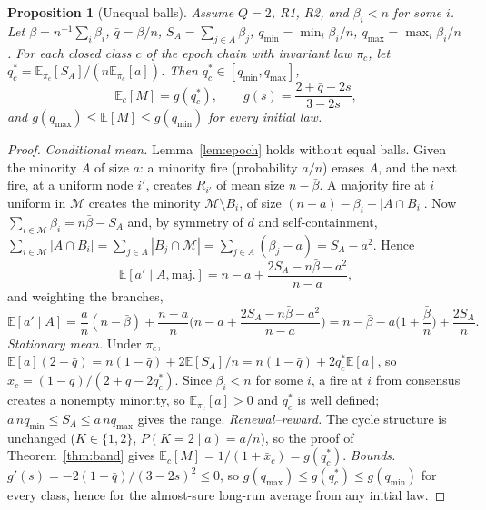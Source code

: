 \documentclass[aps,pre,onecolumn,superscriptaddress,amsmath,amssymb,longbibliography]{revtex4-2}
\newtheorem{proposition}[theorem]{Proposition}
\theoremstyle{definition}
\theoremstyle{remark}
\newcommand{\E}{\mathbb{E}}
\begin{document}
\begin{proposition}[Unequal balls]
\label{prop:het}
Assume $Q=2$, R1, R2, and $\beta_i<n$ for some $i$. Let
$\bar\beta=n^{-1}\sum_i\beta_i$, $\bar q=\bar\beta/n$,
$S_A=\sum_{j\in A}\beta_j$, $q_{\min}=\min_i\beta_i/n$,
$q_{\max}=\max_i\beta_i/n$. For each closed class $c$ of the epoch chain
with invariant law $\pi_c$, let
$q^\ast_c=\E_{\pi_c}[S_A]/(n\E_{\pi_c}[a])$. Then
$q^\ast_c\in[q_{\min},q_{\max}]$,
\begin{equation}
\E_c[M]=g(q^\ast_c),\qquad g(s)=\frac{2+\bar q-2s}{3-2s},
\label{eq:Shet}
\end{equation}
and $g(q_{\max})\le\E[M]\le g(q_{\min})$ for every initial law.
\end{proposition}
\begin{proof}
\emph{Conditional mean.} Lemma~\ref{lem:epoch} holds without equal
balls. Given the minority $A$ of size $a$: a minority fire (probability
$a/n$) erases $A$, and the next fire, at a uniform node $i'$, creates
$R_{i'}$ of mean size $n-\bar\beta$. A majority fire at $i$ uniform in
$\mathcal M$ creates the minority $\mathcal M\setminus B_i$, of size
$(n-a)-\beta_i+|A\cap B_i|$. Now
$\sum_{i\in\mathcal M}\beta_i=n\bar\beta-S_A$ and, by symmetry of $d$ and
self-containment,
$\sum_{i\in\mathcal M}|A\cap B_i|=\sum_{j\in A}|B_j\cap\mathcal M|=\sum_{j\in A}(\beta_j-a)=S_A-a^2$.
Hence
\[
\E[a'\mid A,\text{maj.}]=n-a+\frac{2S_A-n\bar\beta-a^2}{n-a},
\]
and weighting the branches,
\[
\E[a'\mid A]=\frac an(n-\bar\beta)+\frac{n-a}{n}\Big(n-a+\frac{2S_A-n\bar\beta-a^2}{n-a}\Big)
=n-\bar\beta-a\Big(1+\frac{\bar\beta}{n}\Big)+\frac{2S_A}{n}.
\]
\emph{Stationary mean.} Under $\pi_c$,
$\E[a](2+\bar q)=n(1-\bar q)+2\E[S_A]/n=n(1-\bar q)+2q^\ast_c\E[a]$, so
$\bar x_c=(1-\bar q)/(2+\bar q-2q^\ast_c)$. Since $\beta_i<n$ for some
$i$, a fire at $i$ from consensus creates a nonempty minority, so
$\E_{\pi_c}[a]>0$ and $q^\ast_c$ is well defined;
$a\,n q_{\min}\le S_A\le a\,nq_{\max}$ gives the range.
\emph{Renewal--reward.} The cycle structure is unchanged
($K\in\{1,2\}$, $P(K=2\mid a)=a/n$), so the proof of
Theorem~\ref{thm:band} gives $\E_c[M]=1/(1+\bar x_c)=g(q^\ast_c)$.
\emph{Bounds.} $g'(s)=-2(1-\bar q)/(3-2s)^2\le0$, so
$g(q_{\max})\le g(q^\ast_c)\le g(q_{\min})$ for every class, hence for the
almost-sure long-run average from any initial law.
\end{proof}
\end{document}

